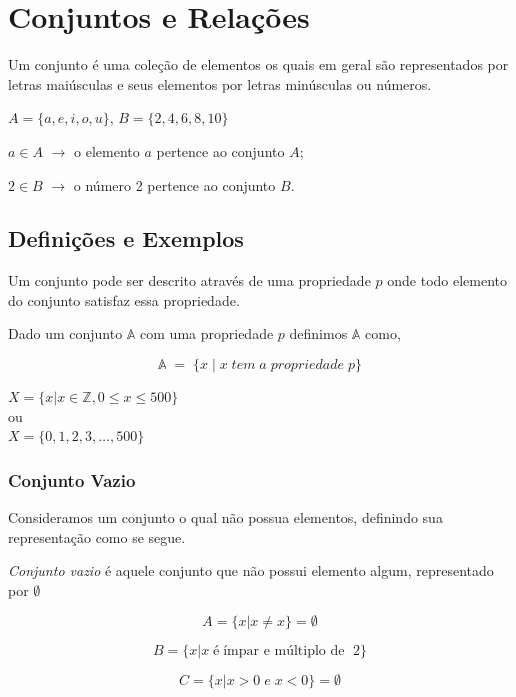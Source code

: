 \section{Conjuntos e Relações} 


Um conjunto é uma coleção de elementos os quais em geral são representados por letras maiúsculas e seus elementos por letras minúsculas ou números. 

$ A = \{ a, e, i, o ,u\} $, $  B = \{2, 4, 6, 8, 10\} $

$a \in A$ $\to$ o elemento $a$ pertence ao conjunto $A$;

$2 \in B$ $\to$ o número 2 pertence ao conjunto $B$.


\subsection{Definições e Exemplos}

Um conjunto pode ser descrito através de uma propriedade $p$ onde todo elemento do conjunto satisfaz essa propriedade.

\begin{definition}
	Dado um conjunto $\mathbb{A}$ com uma propriedade $\mathit{p}$ definimos $\mathbb{A}$ como,
	
	$$ \mathbb{A} \; = \; \{x \; | \; x \; tem \; a \; propriedade \; \mathit{p} \} $$
	
\end{definition} 

\begin{example}
	$X = \{ x | x \in \mathbb{Z}, 0 \leq x \leq 500 \}$ \\
	ou \\
	$ X = \{0, 1, 2, 3, \dots, 500 \} $
\end{example}

\subsubsection{Conjunto Vazio}

Consideramos um conjunto o qual não possua elementos, definindo sua representação como se segue.
\begin{definition}
	\textit{Conjunto vazio} é aquele conjunto que não possui elemento algum, representado por $\emptyset$
\end{definition}

\begin{example}
	$$A = \{ x | x \neq x \} = \emptyset $$

	$$B = \{ x | x \; \text{é} \; \text{ímpar e múltiplo de } \; 2 \}$$

	$$C = \{ x | x > 0 \; e \; x < 0  \} = \emptyset$$
\end{example}

